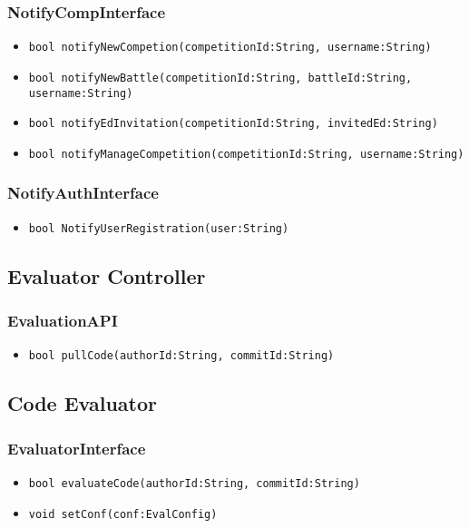 \subsubsection{NotifyCompInterface}
\begin{itemize}
    \item \texttt{bool notifyNewCompetion(competitionId:String, username:String)}
    \item \texttt{bool notifyNewBattle(competitionId:String, battleId:String, username:String)}
    \item \texttt{bool notifyEdInvitation(competitionId:String, invitedEd:String)}%
    \item \texttt{bool notifyManageCompetition(competitionId:String, username:String)}
\end{itemize}

\subsubsection{NotifyAuthInterface}
\begin{itemize}
    \item \texttt{bool NotifyUserRegistration(user:String)}%
\end{itemize}

\subsection{Evaluator Controller}
\subsubsection{EvaluationAPI}
\begin{itemize}
    \item \texttt{bool pullCode(authorId:String, commitId:String)}
\end{itemize}

\subsection{Code Evaluator}
\subsubsection{EvaluatorInterface}
\begin{itemize}
    \item \texttt{bool evaluateCode(authorId:String, commitId:String)}
    \item \texttt{void setConf(conf:EvalConfig)}
\end{itemize}

